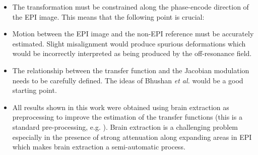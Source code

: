 {\begin{itemize}
    \item{The transformation must be constrained along the phase-encode direction of the EPI image. This means that the following point is crucial:}
    \item{Motion between the EPI image and the non-EPI reference must be accurately estimated. Slight misalignment would produce spurious deformations which would be incorrectly interpreted as being produced by the off-resonance field.}
    \item{The relationship between the transfer function and the Jacobian modulation needs to be carefully defined. The ideas of Bhushan {\it et al.} \cite{Bhushan2015} would be a good starting point.}
	\item{All results shown in this work were obtained using brain extraction as preprocessing to improve the estimation of the transfer functions (this is a standard pre-processing, e.g. \cite{Bhushan2015}). Brain extraction is a challenging problem especially in the presence of strong attenuation along expanding areas in EPI which makes brain extraction a semi-automatic process.}
\end{itemize}}






